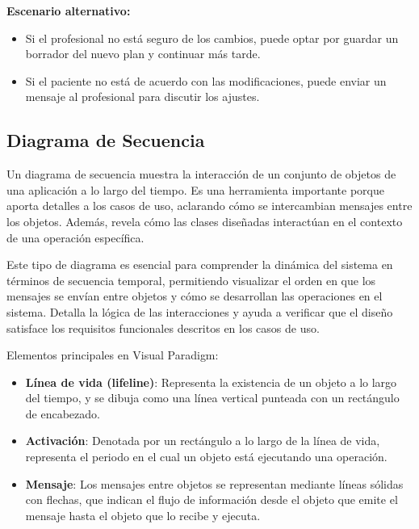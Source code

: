 \documentclass{article}
\begin{document}
\textbf{Escenario alternativo:}
\begin{itemize}
	\item Si el profesional no está seguro de los cambios, puede optar por guardar un borrador del nuevo plan y continuar más tarde.
	\item Si el paciente no está de acuerdo con las modificaciones, puede enviar un mensaje al profesional para discutir los ajustes.
\end{itemize}


\subsection{Diagrama de Secuencia}

Un diagrama de secuencia muestra la interacción de un conjunto de objetos de una aplicación a lo largo del tiempo. Es una herramienta importante porque aporta detalles a los casos de uso, aclarando cómo se intercambian mensajes entre los objetos. Además, revela cómo las clases diseñadas interactúan en el contexto de una operación específica.

Este tipo de diagrama es esencial para comprender la dinámica del sistema en términos de secuencia temporal, permitiendo visualizar el orden en que los mensajes se envían entre objetos y cómo se desarrollan las operaciones en el sistema. Detalla la lógica de las interacciones y ayuda a verificar que el diseño satisface los requisitos funcionales descritos en los casos de uso.

Elementos principales en Visual Paradigm:
\begin{itemize}
	\item \textbf{Línea de vida (lifeline)}: Representa la existencia de un objeto a lo largo del tiempo, y se dibuja como una línea vertical punteada con un rectángulo de encabezado.
	\item \textbf{Activación}: Denotada por un rectángulo a lo largo de la línea de vida, representa el periodo en el cual un objeto está ejecutando una operación.
	\item \textbf{Mensaje}: Los mensajes entre objetos se representan mediante líneas sólidas con flechas, que indican el flujo de información desde el objeto que emite el mensaje hasta el objeto que lo recibe y ejecuta.
\end{itemize}
\end{document}
